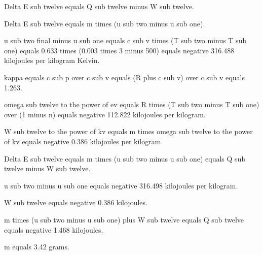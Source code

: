 Delta E sub twelve equals Q sub twelve minus W sub twelve.

Delta E sub twelve equals m times (u sub two minus u sub one).

u sub two final minus u sub one equals c sub v times (T sub two minus T sub one) equals 0.633 times (0.003 times 3 minus 500) equals negative 316.488 kilojoules per kilogram Kelvin.

kappa equals c sub p over c sub v equals (R plus c sub v) over c sub v equals 1.263.

omega sub twelve to the power of ev equals R times (T sub two minus T sub one) over (1 minus n) equals negative 112.822 kilojoules per kilogram.

W sub twelve to the power of kv equals m times omega sub twelve to the power of kv equals negative 0.386 kilojoules per kilogram.

Delta E sub twelve equals m times (u sub two minus u sub one) equals Q sub twelve minus W sub twelve.

u sub two minus u sub one equals negative 316.498 kilojoules per kilogram.

W sub twelve equals negative 0.386 kilojoules.

m times (u sub two minus u sub one) plus W sub twelve equals Q sub twelve equals negative 1.468 kilojoules.

m equals 3.42 grams.